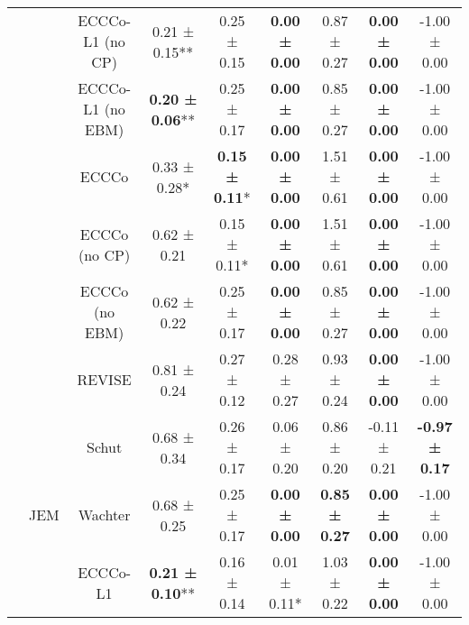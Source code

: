 \begin{longtable}[t]{ccccccccc}
 &  & ECCCo-L1 (no CP) & 0.21 ± 0.15** & 0.25 ± 0.15\hphantom{*}\hphantom{*} & \textbf{0.00 ± 0.00}\hphantom{*}\hphantom{*} & 0.87 ± 0.27\hphantom{*}\hphantom{*} & \textbf{0.00 ± 0.00}\hphantom{*}\hphantom{*} & -1.00 ± 0.00\hphantom{*}\hphantom{*}\\

 &  & ECCCo-L1 (no EBM) & \textbf{0.20 ± 0.06}** & 0.25 ± 0.17\hphantom{*}\hphantom{*} & \textbf{0.00 ± 0.00}\hphantom{*}\hphantom{*} & 0.85 ± 0.27\hphantom{*}\hphantom{*} & \textbf{0.00 ± 0.00}\hphantom{*}\hphantom{*} & -1.00 ± 0.00\hphantom{*}\hphantom{*}\\

 &  & ECCCo & 0.33 ± 0.28*\hphantom{*} & \textbf{0.15 ± 0.11}*\hphantom{*} & \textbf{0.00 ± 0.00}\hphantom{*}\hphantom{*} & 1.51 ± 0.61\hphantom{*}\hphantom{*} & \textbf{0.00 ± 0.00}\hphantom{*}\hphantom{*} & -1.00 ± 0.00\hphantom{*}\hphantom{*}\\

 &  & ECCCo (no CP) & 0.62 ± 0.21\hphantom{*}\hphantom{*} & 0.15 ± 0.11*\hphantom{*} & \textbf{0.00 ± 0.00}\hphantom{*}\hphantom{*} & 1.51 ± 0.61\hphantom{*}\hphantom{*} & \textbf{0.00 ± 0.00}\hphantom{*}\hphantom{*} & -1.00 ± 0.00\hphantom{*}\hphantom{*}\\

 &  & ECCCo (no EBM) & 0.62 ± 0.22\hphantom{*}\hphantom{*} & 0.25 ± 0.17\hphantom{*}\hphantom{*} & \textbf{0.00 ± 0.00}\hphantom{*}\hphantom{*} & 0.85 ± 0.27\hphantom{*}\hphantom{*} & \textbf{0.00 ± 0.00}\hphantom{*}\hphantom{*} & -1.00 ± 0.00\hphantom{*}\hphantom{*}\\

 &  & REVISE & 0.81 ± 0.24\hphantom{*}\hphantom{*} & 0.27 ± 0.12\hphantom{*}\hphantom{*} & 0.28 ± 0.27\hphantom{*}\hphantom{*} & 0.93 ± 0.24\hphantom{*}\hphantom{*} & \textbf{0.00 ± 0.00}\hphantom{*}\hphantom{*} & -1.00 ± 0.00\hphantom{*}\hphantom{*}\\

 &  & Schut & 0.68 ± 0.34\hphantom{*}\hphantom{*} & 0.26 ± 0.17\hphantom{*}\hphantom{*} & 0.06 ± 0.20\hphantom{*}\hphantom{*} & 0.86 ± 0.20\hphantom{*}\hphantom{*} & -0.11 ± 0.21\hphantom{*}\hphantom{*} & \textbf{-0.97 ± 0.17}\hphantom{*}\hphantom{*}\\

 & \multirow[t]{-9}{*}{\centering\arraybackslash JEM} & Wachter & 0.68 ± 0.25\hphantom{*}\hphantom{*} & 0.25 ± 0.17\hphantom{*}\hphantom{*} & \textbf{0.00 ± 0.00}\hphantom{*}\hphantom{*} & \textbf{0.85 ± 0.27}\hphantom{*}\hphantom{*} & \textbf{0.00 ± 0.00}\hphantom{*}\hphantom{*} & -1.00 ± 0.00\hphantom{*}\hphantom{*}\\
\cmidrule{2-9}
 &  & ECCCo-L1 & \textbf{0.21 ± 0.10}** & 0.16 ± 0.14\hphantom{*}\hphantom{*} & 0.01 ± 0.11*\hphantom{*} & 1.03 ± 0.22\hphantom{*}\hphantom{*} & \textbf{0.00 ± 0.00}\hphantom{*}\hphantom{*} & -1.00 ± 0.00\hphantom{*}\hphantom{*}\\


\end{longtable}
